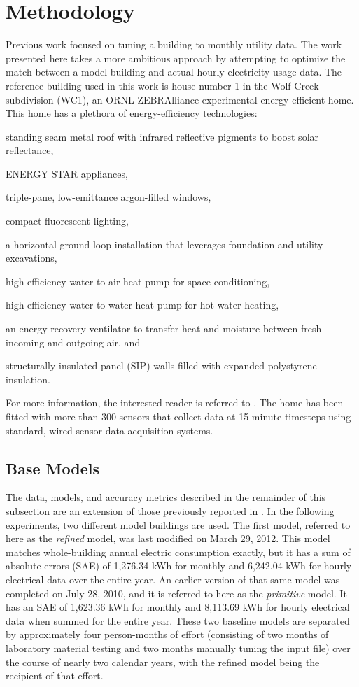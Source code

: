 \documentclass[preprint, review, 12pt]{elsarticle}
\begin{document}
\section{Methodology}
\label{sec:methodology}
Previous work \cite{cit:garrett2013} focused on tuning a building to monthly utility data. The work presented here takes a more ambitious approach by attempting to optimize the match between a model building and actual hourly electricity usage data. The reference building used in this work is house number 1 in the Wolf Creek subdivision (WC1), an ORNL ZEBRAlliance experimental energy-efficient home. This home has a plethora of energy-efficiency technologies: 
\begin{inparaenum}[(1)]
\item standing seam metal roof with infrared reflective pigments to boost solar reflectance,
\item ENERGY STAR appliances, 
\item triple-pane, low-emittance argon-filled windows, 
\item compact fluorescent lighting, 
\item a horizontal ground loop installation that leverages foundation and utility excavations, 
\item high-efficiency water-to-air heat pump for space conditioning, 
\item high-efficiency water-to-water heat pump for hot water heating, 
\item an energy recovery ventilator to transfer heat and moisture between fresh incoming and outgoing air, and 
\item structurally insulated panel (SIP) walls filled with expanded polystyrene insulation.
\end{inparaenum}
For more information, the interested reader is referred to \cite{cit:miller2012,cit:biswas2012}. The home has been fitted with more than 300 sensors that collect data at 15-minute timesteps using standard, wired-sensor data acquisition systems.

\subsection{Base Models}
The data, models, and accuracy metrics described in the remainder of this subsection are an extension of those previously reported in \cite{cit:garrett2013}. In the following experiments, two different model buildings are used. The first model, referred to here as the \emph{refined} model, was last modified on March 29, 2012. This model matches whole-building annual electric consumption exactly, but it has a sum of absolute errors (SAE) of 1,276.34 kWh for monthly and 6,242.04 kWh for hourly electrical data over the entire year. An earlier version of that same model was completed on July 28, 2010, and it is referred to here as the \emph{primitive} model. It has an SAE of 1,623.36 kWh for monthly and 8,113.69 kWh for hourly electrical data when summed for the entire year. These two baseline models are separated by approximately four person-months of effort (consisting of two months of laboratory material testing and two months manually tuning the input file) over the course of nearly two calendar years, with the refined model being the recipient of that effort.
\end{document}
